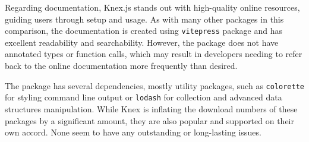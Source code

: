 Regarding documentation, Knex.js stands out with high-quality online resources,
guiding users through setup and usage. As with many other packages in this
comparison, the documentation is created using \texttt{vitepress} package and
has excellent readability and searchability. However, the package does not have
annotated types or function calls, which may result in developers needing to
refer back to the online documentation more frequently than desired.

The package has several dependencies, mostly utility packages, such as
\texttt{colorette} for styling command line output or \texttt{lodash} for
collection and advanced data structures manipulation. While Knex is inflating
the download numbers of these packages by a significant amount, they are also
popular and supported on their own accord. None seem to have any outstanding or
long-lasting issues.